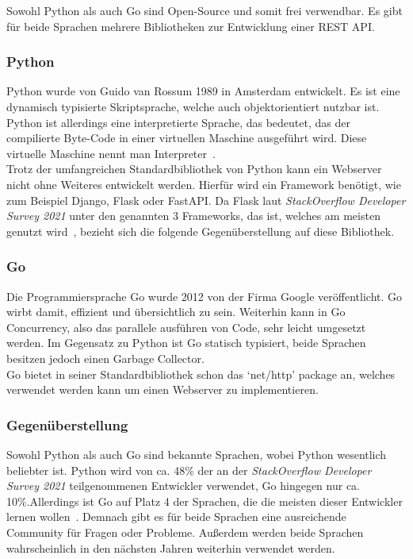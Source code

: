 Sowohl Python als auch Go sind \gls{Open-Source} und somit frei verwendbar. Es 
gibt für beide Sprachen mehrere Bibliotheken zur Entwicklung einer \gls{REST} 
\gls{API}.

\subsubsection{Python}
Python wurde von Guido van Rossum 1989 in Amsterdam entwickelt. Es ist eine 
\gls{dynamisch typisiert}e Skriptsprache, welche auch \gls{objektorientiert} nutzbar 
ist. Python ist allerdings eine interpretierte Sprache, das bedeutet, das der 
compilierte Byte-Code in einer virtuellen Maschine ausgeführt wird. Diese 
virtuelle Maschine nennt man Interpreter~\cite{ErKa20}. \\

Trotz der umfangreichen Standardbibliothek von Python kann ein Webserver nicht
ohne Weiteres entwickelt werden. Hierfür wird ein \gls{Framework} benötigt, wie 
zum Beispiel Django, Flask oder FastAPI. Da Flask laut \textit{StackOverflow 
Developer Survey 2021} unter den genannten 3 Frameworks, das ist, welches am 
meisten genutzt wird~\cite{Sta21}, bezieht sich die folgende Gegenüberstellung 
auf diese Bibliothek. \\

\subsubsection{Go}
Die Programmiersprache Go wurde 2012 von der Firma Google veröffentlicht. Go 
wirbt damit, effizient und übersichtlich zu sein. Weiterhin kann in Go 
Concurrency, also das parallele ausführen von Code, sehr leicht umgesetzt werden.
Im Gegensatz zu Python ist Go \gls{statisch typisiert}, beide Sprachen besitzen jedoch
einen \gls{Garbage Collector}. \\

Go bietet in seiner Standardbibliothek schon das `net/http' package an, welches
verwendet werden kann um einen Webserver zu implementieren. 

\subsubsection{Gegenüberstellung}
Sowohl Python als auch Go sind bekannte Sprachen, wobei Python wesentlich 
beliebter ist. Python wird von ca. 48\% der an der \textit{StackOverflow 
Developer Survey 2021} teilgenommenen Entwickler verwendet, Go hingegen nur ca. 
10\%.Allerdings ist Go auf Platz 4 der Sprachen, die die meisten dieser Entwickler
lernen wollen~\cite{Sta21}. Demnach gibt es für beide Sprachen eine ausreichende
Community für Fragen oder Probleme. Außerdem werden beide Sprachen wahrscheinlich
in den nächsten Jahren weiterhin verwendet werden. \\

